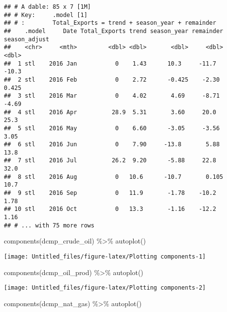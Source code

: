 \documentclass[
]{article}
\newenvironment{Shaded}{\begin{snugshade}}{\end{snugshade}}
\newcommand{\FunctionTok}[1]{\textcolor[rgb]{0.00,0.00,0.00}{#1}}
\newcommand{\NormalTok}[1]{#1}
\newcommand{\SpecialCharTok}[1]{\textcolor[rgb]{0.00,0.00,0.00}{#1}}
\begin{document}
\begin{verbatim}
## # A dable: 85 x 7 [1M]
## # Key:     .model [1]
## # :        Total_Exports = trend + season_year + remainder
##    .model     Date Total_Exports trend season_year remainder season_adjust
##    <chr>     <mth>         <dbl> <dbl>       <dbl>     <dbl>         <dbl>
##  1 stl    2016 Jan           0    1.43      10.3     -11.7         -10.3  
##  2 stl    2016 Feb           0    2.72      -0.425    -2.30          0.425
##  3 stl    2016 Mar           0    4.02       4.69     -8.71         -4.69 
##  4 stl    2016 Apr          28.9  5.31       3.60     20.0          25.3  
##  5 stl    2016 May           0    6.60      -3.05     -3.56          3.05 
##  6 stl    2016 Jun           0    7.90     -13.8       5.88         13.8  
##  7 stl    2016 Jul          26.2  9.20      -5.88     22.8          32.0  
##  8 stl    2016 Aug           0   10.6      -10.7       0.105        10.7  
##  9 stl    2016 Sep           0   11.9       -1.78    -10.2           1.78 
## 10 stl    2016 Oct           0   13.3       -1.16    -12.2           1.16 
## # ... with 75 more rows
\end{verbatim}

\begin{Shaded}
\begin{Highlighting}[]
\FunctionTok{components}\NormalTok{(dcmp\_crude\_oil) }\SpecialCharTok{\%\textgreater{}\%} \FunctionTok{autoplot}\NormalTok{()}
\end{Highlighting}
\end{Shaded}

\begin{center}\texttt{[image: Untitled\_files/figure-latex/Plotting components-1]} \end{center}

\begin{Shaded}
\begin{Highlighting}[]
\FunctionTok{components}\NormalTok{(dcmp\_oil\_prod) }\SpecialCharTok{\%\textgreater{}\%} \FunctionTok{autoplot}\NormalTok{()}
\end{Highlighting}
\end{Shaded}

\begin{center}\texttt{[image: Untitled\_files/figure-latex/Plotting components-2]} \end{center}

\begin{Shaded}
\begin{Highlighting}[]
\FunctionTok{components}\NormalTok{(dcmp\_nat\_gas) }\SpecialCharTok{\%\textgreater{}\%} \FunctionTok{autoplot}\NormalTok{()}
\end{Highlighting}
\end{Shaded}
\end{document}
